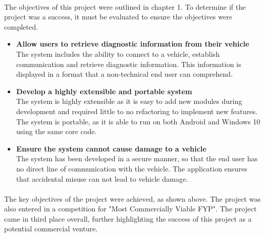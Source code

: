 	\paragraph{}{
	The objectives of this project were outlined in chapter 1. To determine if the project was a success, it must be evaluated to ensure the objectives were completed. 
		\begin{itemize}
			\item \textbf{Allow users to retrieve diagnostic information from their vehicle}\\
			The system includes the ability to connect to a vehicle, establish communication and retrieve diagnostic information. This information is displayed in a format that a non-technical end user can comprehend.
			
			\item \textbf{Develop a highly extensible and portable system}\\
			The system is highly extensible as it is easy to add new modules during development and required little to no refactoring to implement new features. The system is portable, as it is able to run on both Android and Windows 10 using the same core code. 

			\item \textbf{Ensure the system cannot cause damage to a vehicle}\\
			The system has been developed in a secure manner, so that the end user has no direct line of communication with the vehicle. The application ensures that accidental misuse can not lead to vehicle damage. 
		\end{itemize}
	}
	\paragraph{}{
	The key objectives of the project were achieved, as shown above. The project was also entered in a competition for "Most Commercially Viable FYP". The project came in third place overall, further highlighting the success of this project as a potential commercial venture.
	}
	
